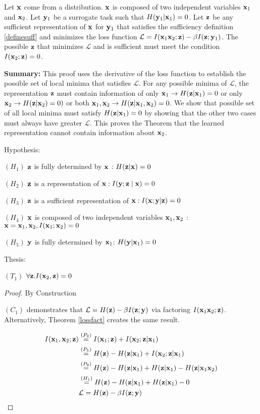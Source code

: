 \begin{theorem}
Let ${\mathbf{x}}$ come from a distribution. ${\mathbf{x}}$ is composed of two independent variables ${\mathbf{x}}_1$ and ${\mathbf{x}}_2$. Let ${\mathbf{y}}_1$ be a surrogate task such that $H({\mathbf{y}}_1|{\mathbf{x}}_1) = 0$. Let ${\mathbf{z}}$ be any sufficient representation of ${\mathbf{x}}$ for ${\mathbf{y}}_1$ that satisfies the sufficiency definition \ref{definesuff} and minimizes the loss function $\mathcal{L} = I({\mathbf{x}}_1 {\mathbf{x}}_2; {\mathbf{z}}) - \beta I({\mathbf{z}};{\mathbf{y}}_1)$. The possible ${\mathbf{z}}$ that minimizes $\mathcal{L}$  and is sufficient must meet the condition $I({\mathbf{x}}_2; {\mathbf{z}}) = 0$.

\textbf{Summary:} This proof uses the derivative of the loss function to establish the possible set of local minima that satisfies $\mathcal{L}$. For any possible minima of $\mathcal{L}$, the representation ${\mathbf{z}}$ must contain information of only  ${\mathbf{x}}_1 \rightarrow H({\mathbf{z}}|{\mathbf{x}}_1)=0$ or only ${\mathbf{x}}_2 \rightarrow H({\mathbf{z}}| {\mathbf{x}}_2)=0)$ or both ${\mathbf{x}}_1, {\mathbf{x}}_2 \rightarrow H({\mathbf{z}}|{\mathbf{x}}_1, {\mathbf{x}}_2)=0$. We show that   possible set of all local minima must satisfy $H({\mathbf{z}}|{\mathbf{x}}_1)=0$ by showing that the other two cases must always have greater $\mathcal{L}$. This proves the Theorem that the learned representation cannot contain information about ${\mathbf{x}}_2$.

Hypothesis:

$(H_1)$  ${\mathbf{z}}$ is fully determined by ${\mathbf{x}}$ : $H({\mathbf{z}}|{\mathbf{x}}) = 0$

$(H_2)$  ${\mathbf{z}}$ is a representation of ${\mathbf{x}}: I({\mathbf{y}} ; {\mathbf{z}} \mid {\mathbf{x}})=0$

$(H_3)$  ${\mathbf{z}}$ is a sufficient representation of ${\mathbf{x}}: I({\mathbf{x}} ; {\mathbf{y}} | {\mathbf{z}})=0$

$(H_4)$ ${\mathbf{x}}$ is composed of two independent variables ${\mathbf{x}}_1, {\mathbf{x}}_2$ : ${\mathbf{x}} = {\mathbf{x}}_1, {\mathbf{x}}_2, I({\mathbf{x}}_1; {\mathbf{x}}_2) = 0$

$(H_5)$ ${\mathbf{y}}$ is fully determined by ${\mathbf{x}}_1$: $H({\mathbf{y}}| {\mathbf{x}}_1) = 0$

Thesis:

$(T_1)$ $\forall {\mathbf{z}}.I({\mathbf{x}}_2,{\mathbf{z}}) = 0$

\begin{proof} By Construction

$(C_1)$ demonstrates that $\mathcal{L}=H({\mathbf{z}}) -\beta I({\mathbf{z}};{\mathbf{y}})$ via factoring $I({\mathbf{x}}_1 {\mathbf{x}}_2;{\mathbf{z}})$. Alternatively, Theorem \ref{lossfact} creates the same result.

$$
\begin{aligned}
I({\mathbf{x}}_1, {\mathbf{x}}_2; {\mathbf{z}}) &\stackrel{\left(P_2\right)}{=} I({\mathbf{x}}_1; {\mathbf{z}}) + I({\mathbf{x}}_2; {\mathbf{z}}| {\mathbf{x}}_1)\\
&\stackrel{\left(P_5\right)}{=} H({\mathbf{z}}) -  H({\mathbf{z}}| {\mathbf{x}}_1) + I({\mathbf{x}}_2; {\mathbf{z}}| {\mathbf{x}}_1) \\
&\stackrel{\left(P_9\right)}{=} H({\mathbf{z}}) -  H({\mathbf{z}}| {\mathbf{x}}_1) + H({\mathbf{z}}| {\mathbf{x}}_1) - H({\mathbf{z}}| {\mathbf{x}}_1 {\mathbf{x}}_2) \\
&\stackrel{\left(H_1\right)}{=}H({\mathbf{z}}) -  H({\mathbf{z}}| {\mathbf{x}}_1) + H({\mathbf{z}}| {\mathbf{x}}_1) - 0 \\
&\mathcal{L}=H({\mathbf{z}})  -\beta I({\mathbf{z}}; {\mathbf{y}})
\end{aligned}
$$


\end{proof}
\end{theorem}
